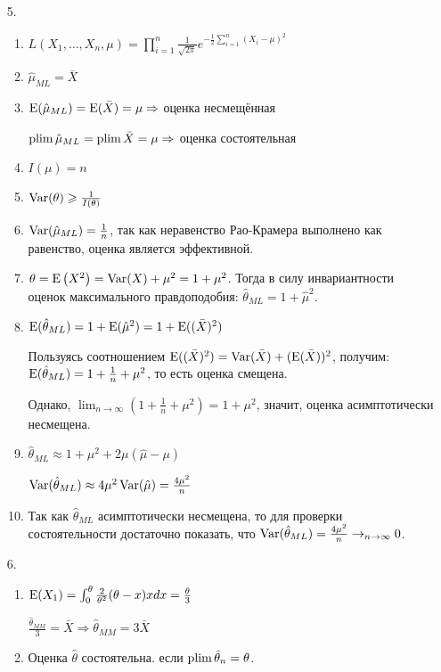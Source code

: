 \begin{enumerate}
\item[5.]
\begin{enumerate}
\item $L(X_1, \ldots, X_n, \mu) = \prod_{i=1}^n \frac{1}{\sqrt{2\pi}} e^{-\frac{1}{2}\sum_{i=1}^n (X_i - \mu)^2}$
\item $\hat\mu_{ML} = \bar X$
\item $\operatorname{E}(\hat\mu_{ML}) = \operatorname{E}(\bar X) = \mu \Rightarrow$ оценка несмещённая

$\operatorname*{plim} \hat \mu_{ML} = \operatorname*{plim} \bar X = \mu \Rightarrow$ оценка состоятельная
\item $I(\mu) = n$
\item $\operatorname{Var}(\theta) \geqslant \frac{1}{I(\theta)}$
\item $\operatorname{Var}(\hat \mu_{ML}) = \frac{1}{n}$, так как неравенство Рао-Крамера выполнено
как равенство, оценка является эффективной.
\item $\theta = \operatorname{E}\left(X^2\right) = \operatorname{Var}(X) + \mu^2 = 1 + \mu^2$.
Тогда в силу инвариантности оценок максимального правдоподобия: $\hat\theta_{ML} = 1 + \hat\mu^2$.
\item $\operatorname{E}(\hat \theta_{ML}) = 1 + \operatorname{E}(\hat \mu^2) = 1 + \operatorname{E}((\bar X)^2)$

Пользуясь соотношением $\operatorname{E}((\bar X)^2) = \operatorname{Var}(\bar X) + (\operatorname{E}(\bar X))^2$,
получим: $\operatorname{E}(\hat \theta_{ML}) = 1 + \frac{1}{n} + \mu^2$, то есть оценка смещена.

Однако, $\lim_{n \to \infty} \left(1 + \frac{1}{n} + \mu^2\right) = 1 + \mu^2$, значит,
оценка асимптотически несмещена.
\item $\hat \theta_{ML} \approx 1 + \mu^2 + 2\mu(\hat \mu - \mu)$

$\operatorname{Var}(\hat \theta_{ML}) \approx 4 \mu^2 \operatorname{Var}(\hat \mu) = \frac{4 \mu^2}{n}$
\item Так как $\hat \theta_{ML}$ асимптотически несмещена, то для проверки
состоятельности достаточно показать, что
$\operatorname{Var}(\hat \theta_{ML}) = \frac{4\mu^2}{n} \to_{n \to \infty} 0$.
\end{enumerate}
\item[6.]
\begin{enumerate}
\item $\operatorname{E}(X_1) = \int_{0}^{\theta} \frac{2}{\theta^2}(\theta - x)x dx = \frac{\theta}{3}$

$\frac{\hat \theta_{MM}}{3} = \bar X \Rightarrow \hat \theta_{MM} = 3 \bar X$
\item Оценка $\hat \theta$ состоятельна. если $\operatorname*{plim} \hat \theta_n = \theta$.


\end{enumerate}
\end{enumerate}
